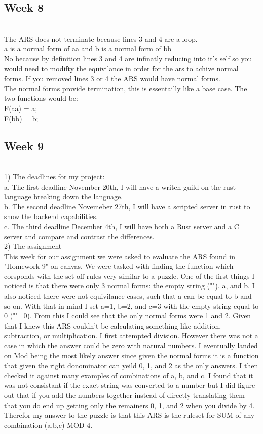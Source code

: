 \documentclass{article}
\theoremstyle{theorem}
\theoremstyle{definition}
\theoremstyle{remark}
\begin{document}
\subsection{Week 8}
\\The ARS does not terminate because lines 3 and 4 are a loop.
\\a is a normal form of aa and b is a normal form of bb
\\No because by definition lines 3 and 4 are infinatly reducing into it's self so you would need to modifty the equivilance in order for the ars to achive normal forms. If you removed lines 3 or 4 the ARS would have normal forms.
\\The normal forms provide termination, this is essentailly like a base case. The two functions would be:
\\F(aa) = a;
\\F(bb) = b;

\subsection{Week 9}
\\1) The deadlines for my project:
\\a. The first deadline November 20th, I will have a writen guild on the rust language breaking down the language.
\\b. The second deadline Novemeber 27th,  I will have a scripted server in rust to show the backend capabilities.
\\c. The third deadline December 4th, I will have both a Rust server and a C server and compare and contrast the differences.
\\2) The assignment
\\This week for our assignment we were asked to evaluate the ARS found in "Homework 9" on canvas. We were tasked with finding the function which corsponds with the set off
rules very similar to a puzzle. One of the first things I noticed is that there were only 3 normal forms: the empty string (""), a, and b. I also noticed there were not equivilance cases, such that
a can be equal to b and so on. With that in mind I set a=1, b=2, and c=3 with the empty string equal to 0 (""=0). From this I could see that the only normal forms were 1 and 2. Given that I knew this ARS couldn't be 
calculating something like addition, subtraction, or multiplication. I first attempted division. However there was not a case in which the answer could be zero with natural numbers. 
I eventually landed on Mod being the most likely answer since given the normal forms it is a function that given the right donominator can yeild 0, 1, and 2 as the only answers. I then checked it against many examples of combinations of a, b, and c.
I found that it was not consistant if the exact string was converted to a number but I did figure out that if you add the numbers together instead of directly translating them that you do end up getting only the remainers 0, 1, and 2 when you divide by 4.
Therefor my answer to the puzzle is that this ARS is the ruleset for SUM of any combination (a,b,c) MOD 4.
\end{document}
